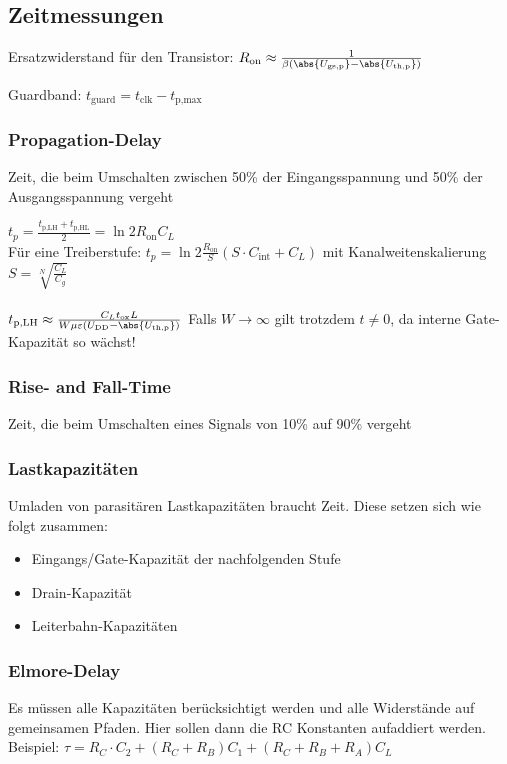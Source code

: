 \documentclass[english]{latex4ei/latex4ei_sheet}
\begin{document}
\subsection{Zeitmessungen}

Ersatzwiderstand für den Transistor: $R_{\text{on}} \approx \frac{1}{\beta (\abs{U_{\text{gs,p}}}-\abs{U_{\text{th,p}}})}$

Guardband: $t_{\text{guard}} = t_{\text{clk}}-t_{\text{p,max}}$

\subsubsection{Propagation-Delay}
Zeit, die beim Umschalten zwischen 50\% der Eingangsspannung und 50\% der Ausgangsspannung vergeht

$t_p = \frac{t_{\text{p,LH}} + t_{\text{p,HL}}}{2} = \ln{2}R_{\text{on}}C_L$\\
Für eine Treiberstufe: $t_p = \ln{2}\frac{R_{\text{on}}}{S}(S\cdot C_{\text{int}} + C_L)$ mit Kanalweitenskalierung $S=\sqrt[N]{\frac{C_L}{C_g}}$\\ \\

$t_{\text{p,LH}} \approx \frac{C_L t_{\text{ox}}L}{W\mu\varepsilon(U_{\text{DD}}-\abs{U_{\text{th,p}}})}$
Falls $W\rightarrow\infty$ gilt trotzdem $t\neq 0$, da interne Gate-Kapazität so wächst!

\subsubsection{Rise- and Fall-Time}
Zeit, die beim Umschalten eines Signals von 10\% auf 90\% vergeht

\subsubsection{Lastkapazitäten}
Umladen von parasitären Lastkapazitäten braucht Zeit.
Diese setzen sich wie folgt zusammen:
\begin{itemize}
	\item Eingangs/Gate-Kapazität der nachfolgenden Stufe
	\item Drain-Kapazität
	\item Leiterbahn-Kapazitäten
\end{itemize}

\subsubsection{Elmore-Delay}
Es müssen alle Kapazitäten berücksichtigt werden und alle Widerstände auf gemeinsamen Pfaden. Hier sollen dann die RC Konstanten aufaddiert werden.\\
Beispiel: $\tau = R_C\cdot C_2 + (R_C+R_B)C_1+(R_C+R_B+R_A)C_L$
\end{document}
